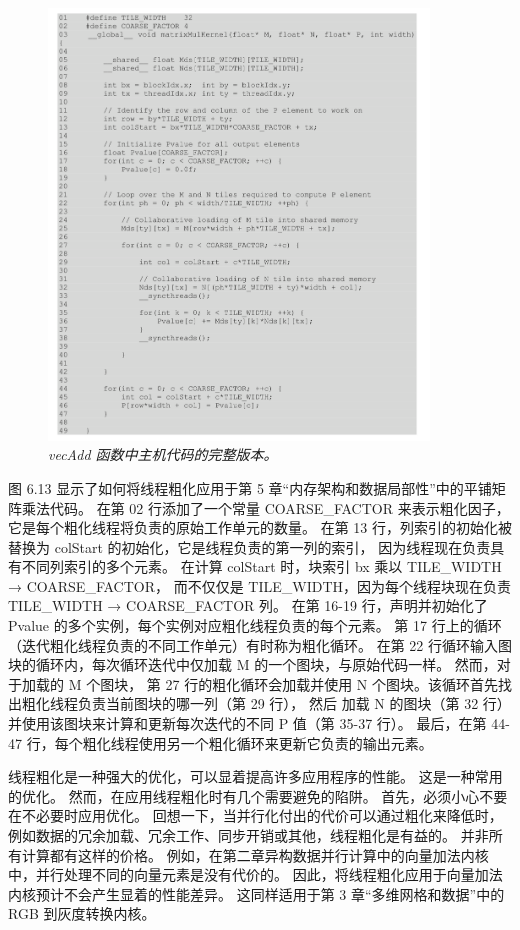 \begin{figure}[H]
	\centering
	\includegraphics[width=0.9\textwidth]{figs/F6.13.png}
	\caption{\textit{\color{red} vecAdd 函数中主机代码的完整版本。}}
\end{figure}

图 6.13 显示了如何将线程粗化应用于第 5 章“内存架构和数据局部性”中的平铺矩阵乘法代码。 
在第 02 行添加了一个常量 COARSE\_FACTOR 来表示粗化因子，它是每个粗化线程将负责的原始工作单元的数量。 
在第 13 行，列索引的初始化被替换为 colStart 的初始化，它是线程负责的第一列的索引，
因为线程现在负责具有不同列索引的多个元素。 在计算 colStart 时，块索引 bx 乘以 TILE\_WIDTH → COARSE\_FACTOR，
而不仅仅是 TILE\_WIDTH，因为每个线程块现在负责 TILE\_WIDTH → COARSE\_FACTOR 列。 
在第 16-19 行，声明并初始化了 Pvalue 的多个实例，每个实例对应粗化线程负责的每个元素。 
第 17 行上的循环（迭代粗化线程负责的不同工作单元）有时称为粗化循环。 
在第 22 行循环输入图块的循环内，每次循环迭代中仅加载 M 的一个图块，与原始代码一样。 然而，对于加载的 M 个图块，
第 27 行的粗化循环会加载并使用 N 个图块。该循环首先找出粗化线程负责当前图块的哪一列（第 29 行），
然后 加载 N 的图块（第 32 行）并使用该图块来计算和更新每次迭代的不同 P 值（第 35-37 行）。 
最后，在第 44-47 行，每个粗化线程使用另一个粗化循环来更新它负责的输出元素。

线程粗化是一种强大的优化，可以显着提高许多应用程序的性能。 这是一种常用的优化。 
然而，在应用线程粗化时有几个需要避免的陷阱。 首先，必须小心不要在不必要时应用优化。 
回想一下，当并行化付出的代价可以通过粗化来降低时，例如数据的冗余加载、冗余工作、同步开销或其他，线程粗化是有益的。 
并非所有计算都有这样的价格。 例如，在第二章异构数据并行计算中的向量加法内核中，并行处理不同的向量元素是没有代价的。 
因此，将线程粗化应用于向量加法内核预计不会产生显着的性能差异。 
这同样适用于第 3 章“多维网格和数据”中的 RGB 到灰度转换内核。

